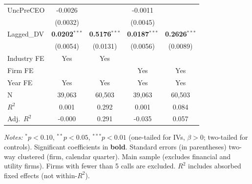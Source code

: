\documentclass[11pt,a4paper]{article}
\begin{document}
\begin{table}[htbp]
\begin{tabular}{lcccc}
UncPreCEO & -0.0026 &  & -0.0011 &  \\
 & (0.0032) &  & (0.0045) &  \\
Lagged\_DV & \textbf{0.0202}$^{***}$ & \textbf{0.5176}$^{***}$ & \textbf{0.0187}$^{***}$ & \textbf{0.2626}$^{***}$ \\
 & (0.0054) & (0.0131) & (0.0056) & (0.0089) \\
\midrule
Industry FE & Yes & Yes &  &  \\
Firm FE &  &  & Yes & Yes \\
Year FE & Yes & Yes & Yes & Yes \\
\midrule
N & 39,063 & 60,503 & 39,063 & 60,503 \\
$R^2$ & 0.001 & 0.292 & 0.001 & 0.084 \\
Adj.~$R^2$ & -0.000 & 0.291 & -0.035 & 0.057 \\
\bottomrule
\end{tabular}
\begin{minipage}{\linewidth}
\vspace{2pt}\scriptsize
\textit{Notes:} $^{*}p<0.10$, $^{**}p<0.05$, $^{***}p<0.01$ (one-tailed for IVs, $\beta > 0$; two-tailed for controls).
 Significant coefficients in \textbf{bold}.
 Standard errors (in parentheses) two-way clustered (firm, calendar quarter).
 Main sample (excludes financial and utility firms). Firms with fewer than 5 calls are excluded.
 $R^2$ includes absorbed fixed effects (not within-$R^2$).
\end{minipage}
\end{table}
\clearpage
\end{document}

